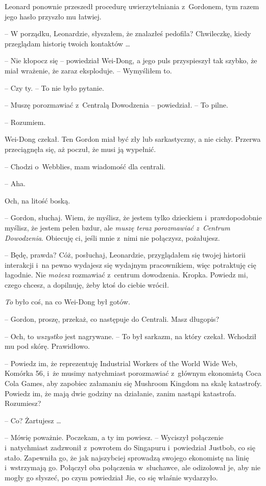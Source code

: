 \documentclass[oneside,polish,11pt,rmheadings]{mwbk}
\begin{document}
Leonard ponownie przeszedł procedurę uwierzytelniania z~Gordonem, tym razem jego hasło przyszło mu łatwiej.

-- W porządku, Leonardzie, słyszałem, że znalazłeś pedofila? Chwileczkę, kiedy przeglądam historię twoich kontaktów \ldots 

-- Nie kłopocz się -- powiedział Wei-Dong, a jego puls przyspieszył tak szybko, że miał wrażenie, że zaraz eksploduje. -- Wymyśliłem to. 

-- Czy ty. -- To nie było pytanie.

-- Muszę porozmawiać z~Centralą Dowodzenia -- powiedział. -- To pilne.

-- Rozumiem. 

Wei-Dong czekał. Ten Gordon miał być zły lub sarkastyczny, a nie cichy. Przerwa przeciągnęła się, aż poczuł, że musi ją wypełnić. 

-- Chodzi o~Webblies, mam wiadomość dla centrali.

-- Aha.

Och, na litość boską. 

-- Gordon, słuchaj. Wiem, że myślisz, że jestem tylko dzieckiem i~prawdopodobnie myślisz, że jestem pełen bzdur, ale \textit{muszę teraz porozmawiać z~Centrum Dowodzenia}. Obiecuję ci, jeśli mnie z~nimi nie połączysz, pożałujesz. 

-- Będę, prawda? Cóż, posłuchaj, Leonardzie, przyglądałem się twojej historii interakcji i~na pewno wydajesz się wydajnym pracownikiem, więc potraktuję cię łagodnie. Nie \textit{możesz }rozmawiać z~centrum dowodzenia. Kropka. Powiedz mi, czego chcesz, a dopilnuję, żeby ktoś do ciebie wrócił.

\textit{To} było coś, na co Wei-Dong był gotów. 

-- Gordon, proszę, przekaż, co następuje do Centrali. Masz długopis?

-- Och, to \textit{wszystko }jest nagrywane. -- To był sarkazm, na który czekał. Wchodził mu pod skórę. Prawidłowo.

-- Powiedz im, że reprezentuję Industrial Workers of the World Wide Web, Komórka 56, i~że musimy natychmiast porozmawiać z~głównym ekonomistą Coca Cola Games, aby zapobiec załamaniu się Mushroom Kingdom na skalę katastrofy. Powiedz im, że mają dwie godziny na działanie, zanim nastąpi katastrofa. Rozumiesz?

-- Co? Żartujesz \ldots 

-- Mówię poważnie. Poczekam, a ty im powiesz. -- Wyciszył połączenie i~natychmiast zadzwonił z~powrotem do Singapuru i~powiedział Justbob, co się stało. Zapewniła go, że jak najszybciej sprowadzą swojego ekonomistę na linię i~wstrzymają go. Połączył oba połączenia w~słuchawce, ale odizolował je, aby nie mogły go słyszeć, po czym powiedział Jie, co się właśnie wydarzyło.
\end{document}
